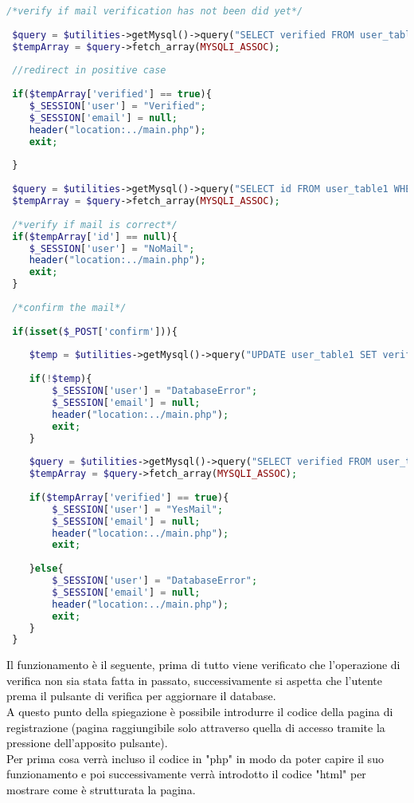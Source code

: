  \begin{lstlisting}[language=php]
 /*verify if mail verification has not been did yet*/
 
 $query = $utilities->getMysql()->query("SELECT verified FROM user_table1 WHERE (email = '{$_SESSION['email']}')");
 $tempArray = $query->fetch_array(MYSQLI_ASSOC);
 
 //redirect in positive case
 
 if($tempArray['verified'] == true){
 	$_SESSION['user'] = "Verified";
 	$_SESSION['email'] = null;
 	header("location:../main.php");
 	exit;
 	
 }
 
 $query = $utilities->getMysql()->query("SELECT id FROM user_table1 WHERE (email = '{$_SESSION['email']}')");
 $tempArray = $query->fetch_array(MYSQLI_ASSOC);
 
 /*verify if mail is correct*/
 if($tempArray['id'] == null){
 	$_SESSION['user'] = "NoMail";
 	header("location:../main.php");
 	exit;
 }
 
 /*confirm the mail*/
 
 if(isset($_POST['confirm'])){
 	
 	$temp = $utilities->getMysql()->query("UPDATE user_table1 SET verified = 1 WHERE (id = '{$tempArray['id']}')");
 	
 	if(!$temp){
 		$_SESSION['user'] = "DatabaseError";
 		$_SESSION['email'] = null;
 		header("location:../main.php");
 		exit;
 	}
 	
 	$query = $utilities->getMysql()->query("SELECT verified FROM user_table1 WHERE (email = '{$_SESSION['email']}')");
 	$tempArray = $query->fetch_array(MYSQLI_ASSOC);
 	
 	if($tempArray['verified'] == true){
 		$_SESSION['user'] = "YesMail";
 		$_SESSION['email'] = null;
 		header("location:../main.php");
 		exit;
 		
 	}else{
 		$_SESSION['user'] = "DatabaseError";
 		$_SESSION['email'] = null;
 		header("location:../main.php");
 		exit;
 	}
 }
 \end{lstlisting}
 
 \textcolor{black}{Il funzionamento è il seguente,  prima di tutto viene verificato che l'operazione di verifica non sia stata fatta in passato, successivamente si aspetta che l'utente prema il pulsante di verifica per aggiornare il database.}\\
 \bigskip
 \textcolor{black}{A questo punto della spiegazione è possibile introdurre il codice della pagina di registrazione (pagina raggiungibile solo attraverso quella di accesso tramite la pressione dell'apposito pulsante).\\
 Per prima cosa verrà incluso il codice in "php" in modo da poter capire il suo funzionamento e poi successivamente verrà introdotto il codice "html" per mostrare come è strutturata la pagina.}\\
 

